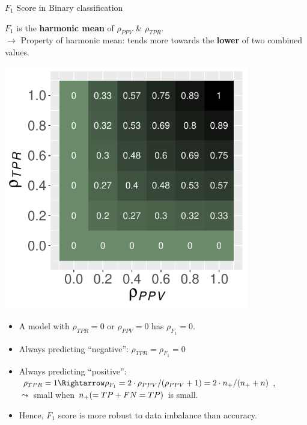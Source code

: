 \documentclass[11pt,compress,t,notes=noshow, xcolor=table]{beamer}
\begin{document}
\begin{frame}{$F_1$ Score in Binary classification}
	\footnotesize{
	
    	\begin{minipage}[c]{0.5\textwidth}
    		$F_1$ is the \textbf{harmonic mean} of $\rho_{PPV}$ \& $\rho_{TPR}$. \\
    		$\rightarrow$ Property of harmonic mean: tends more towards the \textbf{lower} of two combined values.
    	\end{minipage}%
    	\begin{minipage}[c]{0.5\textwidth}
    		\centering
    		\includegraphics[width=0.8\textwidth]{figure/f1_score_plot.pdf}
    	\end{minipage}
	
    	\begin{itemize}
    		\item A model with $\rho_{TPR} = 0$ %
      or 
    		$\rho_{PPV} = 0$ %
      has $\rho_{F_1} = 0$.
      
    		\item Always predicting \enquote{negative}: $\rho_{TPR} = \rho_{F_1} = 0$
      
    		\item Always predicting \enquote{positive}: $\rho_{TPR} = 1 \Rightarrow \rho_{F_1} = 2 \cdot \rho_{PPV} / 
    		(\rho_{PPV} + 1) = 2 \cdot \np / (\np + n)$,\\ 
    		$\leadsto$ small when $n_{+} (= TP + FN = TP)$  is small.
    
            \item Hence, $F_1$ score is more robust to data imbalance than accuracy.
      
    	\end{itemize}
	}
\end{frame}
\end{document}
